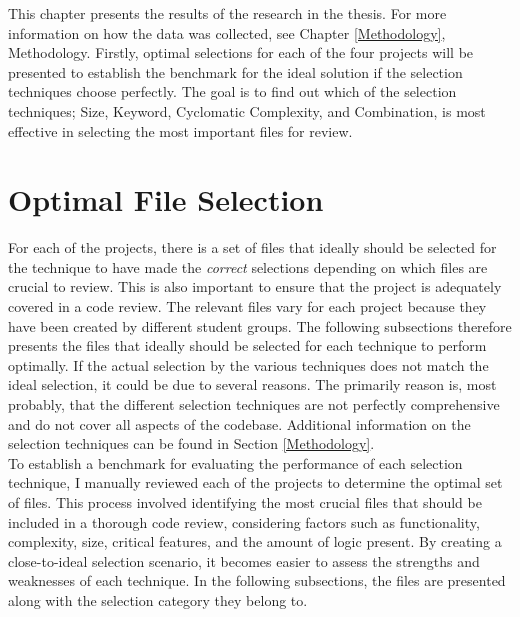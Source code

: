 This chapter presents the results of the research in the thesis. For more information on how the data was collected, see Chapter \ref{Methodology}, Methodology. Firstly, optimal selections for each of the four projects will be presented to establish the benchmark for the ideal solution if the selection techniques choose perfectly. The goal is to find out which of the selection techniques; Size, Keyword, Cyclomatic Complexity, and Combination, is most effective in selecting the most important files for review.



\section{Optimal File Selection} \label{optimal_selections}
For each of the projects, there is a set of files that ideally should be selected for the technique to have made the \textit{correct} selections depending on which files are crucial to review. This is also important to ensure that the project is adequately covered in a code review. The relevant files vary for each project because they have been created by different student groups. The following subsections therefore presents the files that ideally should be selected for each technique to perform optimally. If the actual selection by the various techniques does not match the ideal selection, it could be due to several reasons. The primarily reason is, most probably, that the different selection techniques are not perfectly comprehensive and do not cover all aspects of the codebase. Additional information on the selection techniques can be found in Section \ref{Methodology}. \\

To establish a benchmark for evaluating the performance of each selection technique, I manually reviewed each of the projects to determine the optimal set of files. This process involved identifying the most crucial files that should be included in a thorough code review, considering factors such as functionality, complexity, size, critical features, and the amount of logic present. By creating a close-to-ideal selection scenario, it becomes easier to assess the strengths and weaknesses of each technique. In the following subsections, the files are presented along with the selection category they belong to. \\

